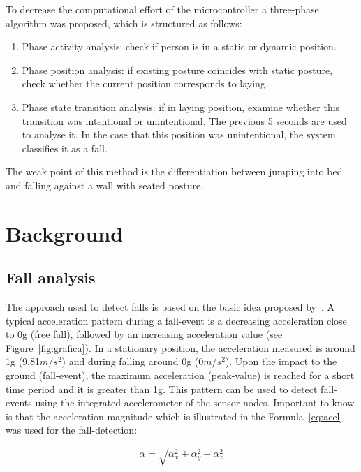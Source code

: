 \documentclass[journal]{IEEEtran}
\begin{document}
To decrease the computational effort of the microcontroller a three-phase algorithm was proposed, which is structured 
as follows:

\begin{enumerate}
 \item Phase activity analysis: check if person is in a static or dynamic position.
 \item Phase position analysis: if existing posture coincides with static posture, check whether the current position corresponds to laying.
 \item Phase state transition analysis: if in laying position, examine whether this transition was intentional or unintentional. The previous 5 
 seconds are used to analyse it. In the case that this position was unintentional, the system classifies it as a fall. 
\end{enumerate}

The weak point of this method is the differentiation between jumping into bed and falling against a wall with seated posture.

\section{Background}
\label{sec:background}

\subsection{Fall analysis}
\label{subsec:analysis}

The approach used to detect falls is based on the basic idea proposed by~\cite{Gjoreski2014,Kozina}. A typical acceleration pattern during 
a fall-event is a decreasing acceleration close to 0g (free fall), followed by an increasing acceleration value (see Figure~\ref{fig:grafica}). In a stationary position, 
the acceleration measured is around 1g (9.81$m/s^{2}$) and during falling around 0g (0$m/s^{2}$). Upon the impact to the ground (fall-event), 
the maximum acceleration (peak-value) is reached for a short time period and it is greater than 1g. This pattern can be used to 
detect fall-events using the integrated accelerometer of the sensor nodes. Important to know is that the acceleration 
magnitude which is illustrated in the Formula~\ref{eq:acel} was used for the fall-detection:

\begin{equation}\label{eq:acel}
 \alpha = \sqrt{\alpha_{x}^{2} + \alpha_{y}^{2} + \alpha_{z}^{2}}
\end{equation}
\end{document}
